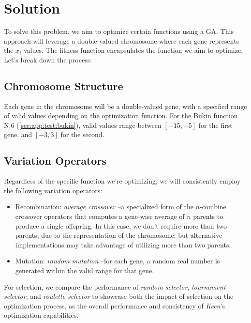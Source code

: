 \section{Solution}
\label{sec:fn_opt:sol}
    To solve this problem, we aim to optimize certain functions using a GA. This approach will leverage a double-valued 
    chromosome where each gene represents the \(x_i\) values. The fitness function encapsulates the function we aim to 
    optimize. Let's break down the process:

    \subsection{Chromosome Structure}
        Each gene in the chromosome will be a double-valued gene, with a specified 
        range of valid values depending on the optimization function. For the Bukin 
        function N.6 (\vref{sec:app:test:bukin}), valid values range between 
        \([-15, -5]\) for the first gene, and \([-3, 3]\) for the second.

    \subsection{Variation Operators}
        Regardless of the specific function we're optimizing, we will consistently 
        employ the following variation operators:

        \begin{itemize}
        \item Recombination: \textit{average crossover} --a specialized form of the \(n\)-combine crossover operators
            that computes a gene-wise average of \(n\) parents to produce a single offspring. In this case, we don't
            require more than two parents, due to the representation of the chromosome, but alternative implementations
            may take advantage of utilizing more than two parents.
        \item Mutation: \textit{random mutation} --for each gene, a random real number is generated within the valid
            range for that gene.
        \end{itemize}

        For selection, we compare the performance of \textit{random selector}, \textit{tournament selector}, and 
        \textit{roulette selector} to showcase both the impact of selection on the optimization process, as the overall
        performance and consistency of \textit{Keen}'s optimization capabilities.

